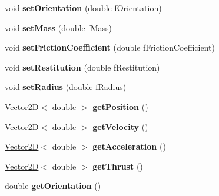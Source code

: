 \begin{DoxyCompactItemize}
\item 
\hypertarget{class_collidable_aabf7ace85a4c054cee3553686efd831b}{}void {\bfseries set\+Orientation} (double f\+Orientation)\label{class_collidable_aabf7ace85a4c054cee3553686efd831b}

\item 
\hypertarget{class_collidable_a0e7594f377c9ce8e47edf88b49e75f81}{}void {\bfseries set\+Mass} (double f\+Mass)\label{class_collidable_a0e7594f377c9ce8e47edf88b49e75f81}

\item 
\hypertarget{class_collidable_ae245dadba8e78387701796177e1e635e}{}void {\bfseries set\+Friction\+Coefficient} (double f\+Friction\+Coefficient)\label{class_collidable_ae245dadba8e78387701796177e1e635e}

\item 
\hypertarget{class_collidable_aee5e648d122a9dad08cfc04b2a84e079}{}void {\bfseries set\+Restitution} (double f\+Restitution)\label{class_collidable_aee5e648d122a9dad08cfc04b2a84e079}

\item 
\hypertarget{class_collidable_a80b43860029e06e0baae666c762b6521}{}void {\bfseries set\+Radius} (double f\+Radius)\label{class_collidable_a80b43860029e06e0baae666c762b6521}

\item 
\hypertarget{class_collidable_ad5022811d28d0db8a58e4ecfda914f4b}{}\hyperlink{class_vector2_d}{Vector2\+D}$<$ double $>$ {\bfseries get\+Position} ()\label{class_collidable_ad5022811d28d0db8a58e4ecfda914f4b}

\item 
\hypertarget{class_collidable_abfdcd815a5f8aabd860e2b69bc4bea21}{}\hyperlink{class_vector2_d}{Vector2\+D}$<$ double $>$ {\bfseries get\+Velocity} ()\label{class_collidable_abfdcd815a5f8aabd860e2b69bc4bea21}

\item 
\hypertarget{class_collidable_ac6387b72fd5e194cd3e38cf22e30e75a}{}\hyperlink{class_vector2_d}{Vector2\+D}$<$ double $>$ {\bfseries get\+Acceleration} ()\label{class_collidable_ac6387b72fd5e194cd3e38cf22e30e75a}

\item 
\hypertarget{class_collidable_aea55329ca9229dc988a38d4d59509c02}{}\hyperlink{class_vector2_d}{Vector2\+D}$<$ double $>$ {\bfseries get\+Thrust} ()\label{class_collidable_aea55329ca9229dc988a38d4d59509c02}

\item 
\hypertarget{class_collidable_a0f8359be0151a1459adb832a8bc579fe}{}double {\bfseries get\+Orientation} ()\label{class_collidable_a0f8359be0151a1459adb832a8bc579fe}


\end{DoxyCompactItemize}
